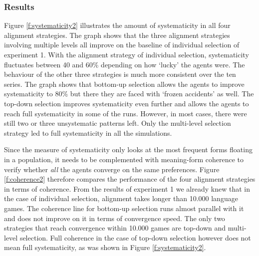 \subsubsection{Results}
 Figure \ref{f:systematicity2} illustrates the amount of systematicity in all four alignment strategies. The graph shows that the three alignment strategies involving multiple levels all improve on the baseline of individual selection of experiment 1. With the alignment strategy of individual selection, systematicity fluctuates between 40 and 60\% depending on how `lucky' the agents were. The behaviour of the other three strategies is much more consistent over the ten series. The graph shows that bottom-up selection allows the agents to improve systematicity to 80\% but there they are faced with `frozen accidents' as well. The top-down selection improves systematicity even further and allows the agents to reach full systematicity in some of the runs. However, in most cases, there were still two or three unsystematic patterns left. Only the multi-level selection strategy led to full systematicity in all the simulations.

Since the measure of systematicity only looks at the most frequent forms floating in a population, it needs to be complemented with meaning-form coherence to verify whether {\em all} the agents converge on the same preferences. Figure \ref{f:coherence2} therefore compares the performance of the four alignment strategies in terms of coherence. From the results of experiment 1 we already knew that in the case of individual selection, alignment takes longer than 10.000 language games. The coherence line for bottom-up selection runs almost parallel with it and does not improve on it in terms of convergence speed. The only two strategies that reach convergence within 10.000 games are top-down and multi-level selection. Full coherence in the case of top-down selection however does not mean full systematicity, as was shown in Figure \ref{f:systematicity2}.

